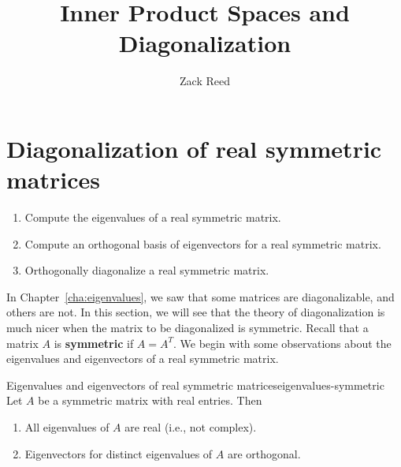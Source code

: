\documentclass{ximera}
\author{Zack Reed}
\title{Inner Product Spaces and Diagonalization}
\begin{document}
\begin{abstract}

\end{abstract}
\maketitle

\section{Diagonalization of real symmetric matrices}

  \begin{enumerate}
  \item Compute the eigenvalues of a real symmetric matrix.
  \item Compute an orthogonal basis of eigenvectors for a real symmetric
    matrix.
  \item Orthogonally diagonalize a real symmetric matrix. 
  \end{enumerate}

In Chapter~\ref{cha:eigenvalues}, we saw that some matrices are
diagonalizable, and others are not. In this section, we will see that
the theory of diagonalization is much nicer when the matrix to be
diagonalized is symmetric. Recall that a matrix $A$ is
\textbf{symmetric}%
%
 if $A=A^T$. We begin with some observations
about the eigenvalues and eigenvectors of a real symmetric matrix.

\begin{proposition}{Eigenvalues and eigenvectors of real symmetric matrices}{eigenvalues-symmetric}
  Let $A$ be a symmetric matrix with real entries. Then

    \begin{enumerate}
    \item All eigenvalues of $A$ are real (i.e., not complex).
    \item Eigenvectors for distinct eigenvalues of $A$ are orthogonal.
    \end{enumerate}

\end{proposition}
\end{document}
